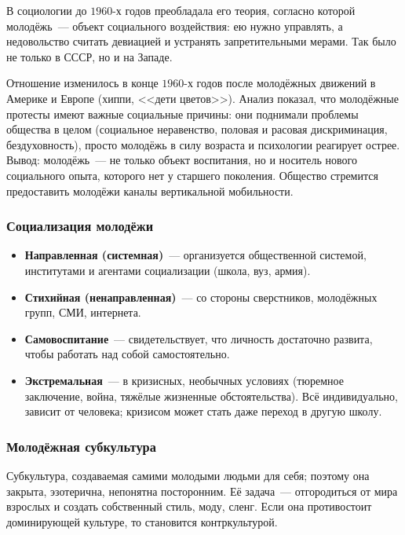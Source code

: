 \documentclass[12pt]{article}
\begin{document}
	\begin{person}
		В социологии до $1960$-х годов преобладала его теория, согласно которой молодёжь~--- объект социального воздействия: ею нужно управлять, а недовольство считать девиацией и устранять запретительными мерами. Так было не только в СССР, но и на Западе.
	\end{person}

	\begin{note}
		Отношение изменилось в конце $1960$-х годов после молодёжных движений в Америке и Европе (хиппи, <<дети цветов>>). Анализ показал, что молодёжные протесты имеют важные социальные причины: они поднимали проблемы общества в целом (социальное неравенство, половая и расовая дискриминация, бездуховность), просто молодёжь в силу возраста и психологии реагирует острее. Вывод: молодёжь~--- не только объект воспитания, но и носитель нового социального опыта, которого нет у старшего поколения. Общество стремится предоставить молодёжи каналы вертикальной мобильности.
	\end{note}

	\subsubsection{Социализация молодёжи}

	\begin{itemize}
		\item \textbf{Направленная (системная)}~--- организуется общественной системой, институтами и агентами социализации (школа, вуз, армия).
		\item \textbf{Стихийная (ненаправленная)}~--- со стороны сверстников, молодёжных групп, СМИ, интернета.
		\item \textbf{Самовоспитание}~--- свидетельствует, что личность достаточно развита, чтобы работать над собой самостоятельно.
		\item \textbf{Экстремальная}~--- в кризисных, необычных условиях (тюремное заключение, война, тяжёлые жизненные обстоятельства). Всё индивидуально, зависит от человека; кризисом может стать даже переход в другую школу.
	\end{itemize}

	\subsubsection{Молодёжная субкультура}

	\begin{definition}
		Субкультура, создаваемая самими молодыми людьми для себя; поэтому она закрыта, эзотерична, непонятна посторонним. Её задача~--- отгородиться от мира взрослых и создать собственный стиль, моду, сленг. Если она противостоит доминирующей культуре, то становится контркультурой.
	\end{definition}
\end{document}
